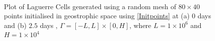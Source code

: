 \begin{figure}[ht!]
	\centering
	\\
	\caption{Plot of Laguerre Cells generated using a random mesh of $80 \times 40$ points initialised in geostrophic space using \ref{Initpoints} at (a) $0$ days and (b) $2.5$ days , $\Gamma = [-L,L]\times[0,H]$, where $L = 1\times10^6$ and $H = 1\times10^4$}
	\label{lagcells1}
\end{figure}
\newpage
